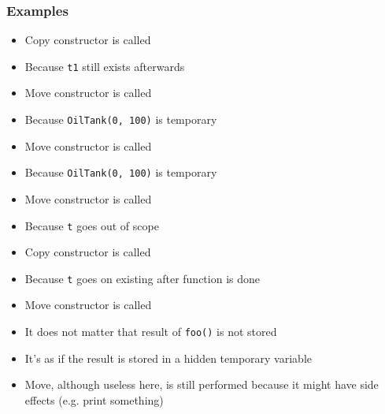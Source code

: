 \documentclass{../ucll-slides}
\begin{document}
\begin{frame}
  \frametitle{Examples}
  \begin{overprint}





  \end{overprint}
  \vskip5mm
  \begin{overprint}
    \begin{itemize}
      \item Copy constructor is called
      \item Because {\tt t1} still exists afterwards
    \end{itemize}

    \begin{itemize}
      \item Move constructor is called
      \item Because {\tt OilTank(0, 100)} is temporary
    \end{itemize}

    \begin{itemize}
      \item Move constructor is called
      \item Because {\tt OilTank(0, 100)} is temporary
    \end{itemize}

    \begin{itemize}
      \item Move constructor is called
      \item Because {\tt t} goes out of scope
    \end{itemize}

    \begin{itemize}
      \item Copy constructor is called
      \item Because {\tt t} goes on existing after function is done
    \end{itemize}

    \begin{itemize}
      \item Move constructor is called
      \item It does not matter that result of {\tt foo()} is not stored
      \item It's as if the result is stored in a hidden temporary variable
      \item Move, although useless here, is still performed because it might have side effects (e.g. print something)
    \end{itemize}
  \end{overprint}
\end{frame}
\end{document}
